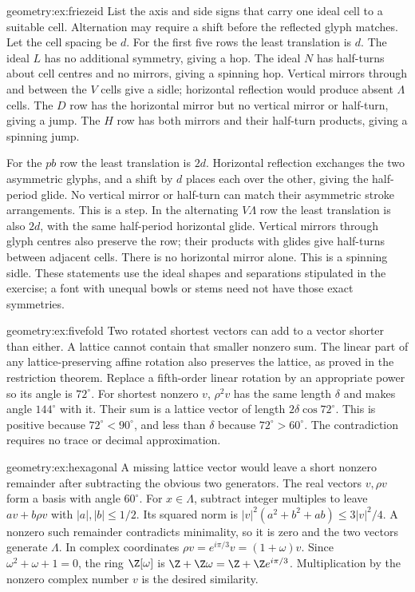 \begin{solution}{geometry:ex:friezeid}
\idea List the axis and side signs that carry one ideal cell to a suitable cell. Alternation may require a shift before the reflected glyph matches.
\writeup Let the cell spacing be $d$. For the first five rows the least translation is $d$. The ideal $L$ has no additional symmetry, giving a hop. The ideal $N$ has half-turns about cell centres and no mirrors, giving a spinning hop. Vertical mirrors through and between the $V$ cells give a sidle; horizontal reflection would produce absent $\Lambda$ cells. The $D$ row has the horizontal mirror but no vertical mirror or half-turn, giving a jump. The $H$ row has both mirrors and their half-turn products, giving a spinning jump.

For the $pb$ row the least translation is $2d$. Horizontal reflection exchanges the two asymmetric glyphs, and a shift by $d$ places each over the other, giving the half-period glide. No vertical mirror or half-turn can match their asymmetric stroke arrangements. This is a step. In the alternating $V\Lambda$ row the least translation is also $2d$, with the same half-period horizontal glide. Vertical mirrors through glyph centres also preserve the row; their products with glides give half-turns between adjacent cells. There is no horizontal mirror alone. This is a spinning sidle. These statements use the ideal shapes and separations stipulated in the exercise; a font with unequal bowls or stems need not have those exact symmetries.
\end{solution}

\begin{solution}{geometry:ex:fivefold}
\idea Two rotated shortest vectors can add to a vector shorter than either. A lattice cannot contain that smaller nonzero sum.
\writeup The linear part of any lattice-preserving affine rotation also preserves the lattice, as proved in the restriction theorem. Replace a fifth-order linear rotation by an appropriate power so its angle is $72^\circ$. For shortest nonzero $v$, $\rho^2v$ has the same length $\delta$ and makes angle $144^\circ$ with it. Their sum is a lattice vector of length $2\delta\cos72^\circ$. This is positive because $72^\circ<90^\circ$, and less than $\delta$ because $72^\circ>60^\circ$. The contradiction requires no trace or decimal approximation.
\end{solution}

\begin{solution}{geometry:ex:hexagonal}
\idea A missing lattice vector would leave a short nonzero remainder after subtracting the obvious two generators.
\writeup The real vectors $v,\rho v$ form a basis with angle $60^\circ$. For $x\in\Lambda$, subtract integer multiples to leave $av+b\rho v$ with $|a|,|b|\le1/2$. Its squared norm is
$|v|^2(a^2+b^2+ab)\le3|v|^2/4$. A nonzero such remainder contradicts minimality, so it is zero and the two vectors generate $\Lambda$. In complex coordinates $\rho v=e^{i\pi/3}v=(1+\omega)v$. Since $\omega^2+\omega+1=0$, the ring $\Z[\omega]$ is $\Z+\Z\omega=\Z+\Z e^{i\pi/3}$. Multiplication by the nonzero complex number $v$ is the desired similarity.
\end{solution}

